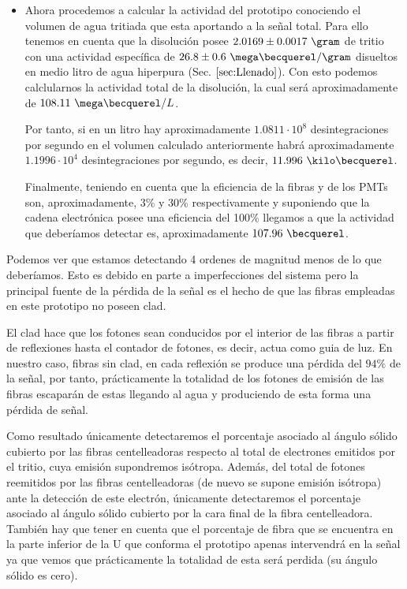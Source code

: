 \begin{itemize}
\item{} Ahora procedemos a calcular la actividad del prototipo conociendo el volumen de agua tritiada que esta aportando a la señal total. Para ello tenemos en cuenta que la disolución posee $2.0169 \pm 0.0017~\gram$ de tritio con una actividad específica de $26.8 \pm 0.6~\mega\becquerel/\gram$ disueltos en medio litro de agua hiperpura (Sec. $\ref{sec:Llenado}$). Con esto podemos calclularnos la actividad total de la disolución, la cual será aproximadamente de $108.11~\mega\becquerel/L$. 

Por tanto, si en un litro hay aproximadamente $1.0811\cdotp 10^{8}$ desintegraciones por segundo en el volumen calculado anteriormente habrá aproximadamente $1.1996\cdotp 10^{4}$ desintegraciones por segundo, es decir, $11.996~\kilo\becquerel$.

Finalmente, teniendo en cuenta que la eficiencia de la fibras y de los PMTs son, aproximadamente, 3\% y 30\% respectivamente y suponiendo que la cadena electrónica posee una eficiencia del 100\% llegamos a que la actividad que deberíamos detectar es, aproximadamente $107.96~\becquerel$.

\end{itemize}

Podemos ver que estamos detectando 4 ordenes de magnitud menos de lo que deberíamos. Esto es debido en parte a imperfecciones del sistema pero la principal fuente de la pérdida de la señal es el hecho de que las fibras empleadas en este prototipo no poseen clad. 

El clad hace que los fotones sean conducidos por el interior de las fibras a partir de reflexiones hasta el contador de fotones, es decir, actua como guia de luz. En nuestro caso, fibras sin clad, en cada reflexión se produce una pérdida del $94\%$ de la señal, por tanto, prácticamente la totalidad de los fotones de emisión de las fibras escaparán de estas llegando al agua y produciendo de esta forma una pérdida de señal. 

Como resultado únicamente detectaremos el porcentaje asociado al ángulo sólido cubierto por las fibras centelleadoras respecto al total de electrones emitidos por el tritio, cuya emisión supondremos isótropa. Además, del total de fotones reemitidos por las fibras centelleadoras (de nuevo se supone emisión isótropa) ante la detección de este electrón, únicamente detectaremos el porcentaje asociado al ángulo sólido cubierto por la cara final de la fibra centelleadora. También hay que tener en cuenta que el porcentaje de fibra que se encuentra en la parte inferior de la U que conforma el prototipo apenas intervendrá en la señal ya que vemos que prácticamente la totalidad de esta será perdida (su ángulo sólido es cero). 

